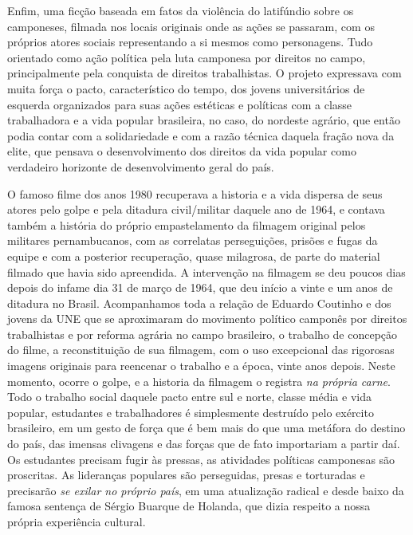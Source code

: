Enfim, uma ficção baseada em fatos da violência do latifúndio sobre os
camponeses, filmada nos locais originais onde as ações se passaram, com
os próprios atores sociais representando a si mesmos como personagens.
Tudo orientado como ação política pela luta camponesa por direitos no
campo, principalmente pela conquista de direitos trabalhistas. O projeto
expressava com muita força o pacto, característico do tempo, dos jovens
universitários de esquerda organizados para suas ações estéticas e
políticas com a classe trabalhadora e a vida popular brasileira, no
caso, do nordeste agrário, que então podia contar com a solidariedade e
com a razão técnica daquela fração nova da elite, que pensava o
desenvolvimento dos direitos da vida popular como verdadeiro horizonte
de desenvolvimento geral do país.

O famoso filme dos anos 1980 recuperava a historia e a vida dispersa de
seus atores pelo golpe e pela ditadura civil/militar daquele ano de
1964, e contava também a história do próprio empastelamento da filmagem
original pelos militares pernambucanos, com as correlatas perseguições,
prisões e fugas da equipe e com a posterior recuperação, quase
milagrosa, de parte do material filmado que havia sido apreendida. A
intervenção na filmagem se deu poucos dias depois do infame dia 31 de
março de 1964, que deu início a vinte e um anos de ditadura no Brasil.
Acompanhamos toda a relação de Eduardo Coutinho e dos jovens da UNE que
se aproximaram do movimento político camponês por direitos trabalhistas
e por reforma agrária no campo brasileiro, o trabalho de concepção do
filme, a reconstituição de sua filmagem, com o uso excepcional das
rigorosas imagens originais para reencenar o trabalho e a época, vinte
anos depois. Neste momento, ocorre o golpe, e a historia da filmagem o
registra \emph{na própria carne}. Todo o trabalho social daquele pacto
entre sul e norte, classe média e vida popular, estudantes e
trabalhadores é simplesmente destruído pelo exército brasileiro, em um
gesto de força que é bem mais do que uma metáfora do destino do país,
das imensas clivagens e das forças que de fato importariam a partir daí.
Os estudantes precisam fugir às pressas, as atividades políticas
camponesas são proscritas. As lideranças populares são perseguidas,
presas e torturadas e precisarão \emph{se exilar no próprio país}, em
uma atualização radical e desde baixo da famosa sentença de Sérgio
Buarque de Holanda, que dizia respeito a nossa própria experiência
cultural.

